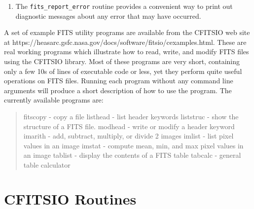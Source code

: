\documentclass[11pt]{article}
\begin{document}
\begin{enumerate}
All of the CFITSIO routines which read or write header keywords,
image data, or table data operate only within the currently opened
HDU in the file. To read or write information in a different HDU you must
first explicitly move to that HDU (see the {\tt fits\_movabs\_hdu} and
{\tt fits\_movrel\_hdu} routines in section 4.3).

\item

The {\tt fits\_report\_error} routine provides a convenient way to print out
diagnostic messages about any error that may have occurred.

\end{enumerate}

A set of example FITS utility programs are  available from the CFITSIO
web site at \newline
https://heasarc.gsfc.nasa.gov/docs/software/fitsio/cexamples.html.
These are real working programs which illustrate how to read, write,
and modify FITS files using the CFITSIO library.  Most of these
programs are very short, containing only a few 10s of lines of
executable code or less, yet they perform quite useful operations on
FITS files. Running each program without any command line arguments
will produce a short description of how to use the program.
The currently available programs are:
\begin{quote}
fitscopy - copy a file
\newline
listhead - list header keywords
\newline
liststruc - show the structure of a FITS file.
\newline
modhead  - write or modify a header keyword
\newline
imarith  - add, subtract, multiply, or divide 2 images
\newline
imlist  - list pixel values in an image
\newline
imstat  - compute mean, min, and max pixel values in an image
\newline
tablist - display the contents of a FITS table
\newline
tabcalc  - general table calculator
\end{quote}

\newpage

\section{CFITSIO Routines}
\end{document}

